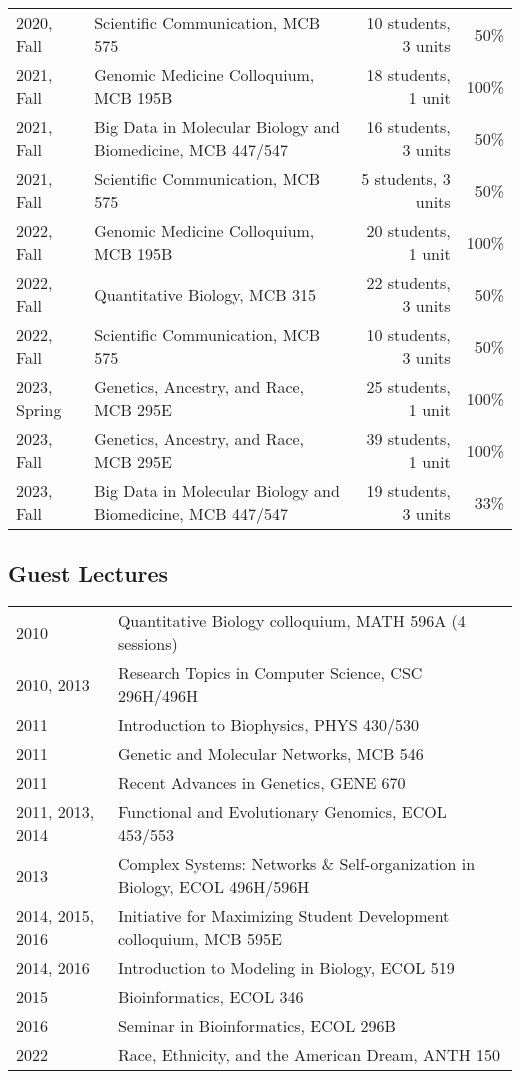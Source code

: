 \documentclass[11pt]{article}
\begin{document}
\begin{longtable}[l]{l l r r}
2020, Fall & Scientific Communication, MCB 575 & 10 students, 3 units & 50\%\\
2021, Fall & Genomic Medicine Colloquium, MCB 195B & 18 students, 1 unit& 100\%\\
2021, Fall & Big Data in Molecular Biology and Biomedicine, MCB 447/547 & 16 students, 3 units & 50\%\\
2021, Fall & Scientific Communication, MCB 575 & 5 students, 3 units & 50\%\\
2022, Fall & Genomic Medicine Colloquium, MCB 195B & 20 students, 1 unit& 100\%\\
2022, Fall & Quantitative Biology, MCB 315 & 22 students, 3 units & 50\%\\
2022, Fall & Scientific Communication, MCB 575 & 10 students, 3 units & 50\%\\
2023, Spring & Genetics, Ancestry, and Race, MCB 295E & 25 students, 1 unit & 100\%\\
2023, Fall & Genetics, Ancestry, and Race, MCB 295E & 39 students, 1 unit & 100\%\\
2023, Fall & Big Data in Molecular Biology and Biomedicine, MCB 447/547 & 19 students, 3 units & 33\%\\
\end{longtable}

\subsection*{Guest Lectures}
\begin{longtable}[l]{l l}
2010 & Quantitative Biology colloquium, MATH 596A (4 sessions)\\
2010, 2013 & Research Topics in Computer Science, CSC 296H/496H\\
2011 & Introduction to Biophysics, PHYS 430/530\\
2011 & Genetic and Molecular Networks, MCB 546\\
2011 & Recent Advances in Genetics, GENE 670\\
2011, 2013, 2014 & Functional and Evolutionary Genomics, ECOL 453/553\\
2013 & Complex Systems: Networks \& Self-organization in Biology, ECOL 496H/596H\\
2014, 2015, 2016 & Initiative for Maximizing Student Development colloquium, MCB 595E\\
2014, 2016 & Introduction to Modeling in Biology, ECOL 519\\
2015 & Bioinformatics, ECOL 346\\
2016 & Seminar in Bioinformatics, ECOL 296B\\
2022 & Race, Ethnicity, and the American Dream, ANTH 150\\
\end{longtable}
\end{document}
